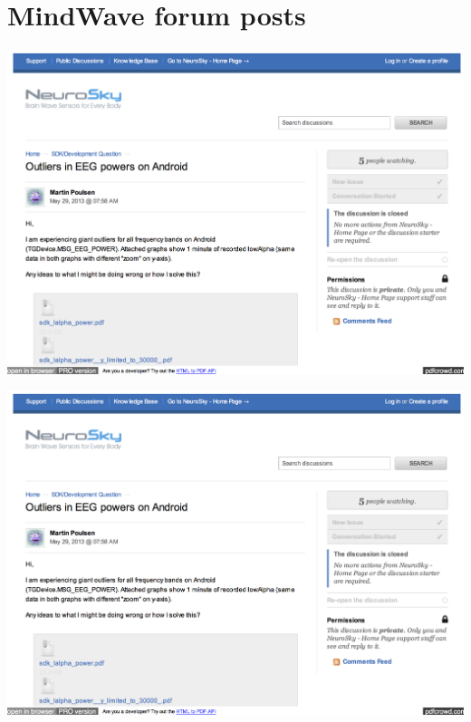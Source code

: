\documentclass[a4paper,10pt,english,lof,lot,twoside]{puthesis}
\begin{document}
\chapter{MindWave forum posts}
\label{appendix_experiment_mindwave_fora_posts:appendix-experiment-mindwave-fora-posts}\label{appendix_experiment_mindwave_fora_posts:mindwave-forum-posts}
{\hfill\includegraphics[width=1.000\linewidth]{support_neurosky_com_discussions_sdk_developers_1934_outlier_1.png}\hfill}

{\hfill\includegraphics[width=1.000\linewidth]{support_neurosky_com_discussions_sdk_developers_1934_outlier_2.png}\hfill}
\end{document}
